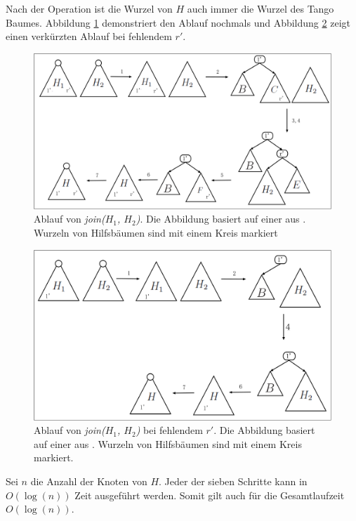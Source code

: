 \documentclass[a4paper,12pt]{article}
\begin{document}
Nach der Operation ist die Wurzel von $H$ auch immer die Wurzel des Tango Baumes. Abbildung \ref{fig:join} demonstriert den Ablauf nochmals und Abbildung \ref{fig:join2} zeigt einen verkürzten Ablauf bei fehlendem $r'$.
\begin{figure}[H]
	\centering
	\includegraphics[width=1\textwidth]{"Medien/Tango/join"}
	\caption{Ablauf von \textit{join($H_1$, $H_2$)}. Die Abbildung basiert auf einer aus \cite{demainDinamicOpti}. Wurzeln von Hilfsbäumen sind mit einem Kreis markiert }
	\label{fig:join}
\end{figure}
\begin{figure}[H]
	\centering
	\includegraphics[width=1\textwidth]{"Medien/Tango/join2"}
	\caption{Ablauf von  \textit{join($H_1$, $H_2$)} bei fehlendem $r'$. Die Abbildung basiert auf einer aus \cite{demainDinamicOpti}. Wurzeln von Hilfsbäumen sind mit einem Kreis markiert. }
	\label{fig:join2}
\end{figure}

\noindent Sei $n$ die Anzahl der Knoten von $H$. Jeder der sieben Schritte kann in $O\left(\log \left(n\right)\right)$ Zeit ausgeführt werden. Somit gilt auch für die Gesamtlaufzeit $O\left(\log \left(n\right)\right)$.
\end{document}
